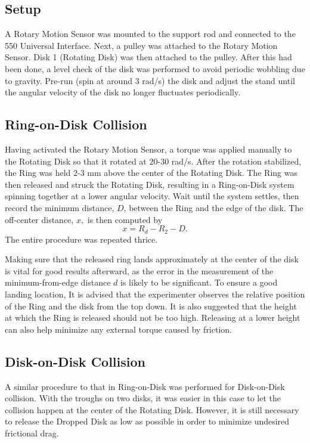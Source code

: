 \subsection{Setup}
A Rotary Motion Sensor was mounted to the support rod and connected to the 550 Universal Interface. Next, a pulley was attached to the Rotary Motion Sensor. Disk 1 (Rotating Disk) was then attached to the pulley. After this had been done, a level check of the disk was performed to avoid periodic wobbling due to gravity. Pre-run (spin at around $3$ rad/s) the disk and adjust the stand until the angular velocity of the disk no longer fluctuates periodically.

\subsection{Ring-on-Disk Collision}
Having activated the Rotary Motion Sensor, a torque was applied manually to the Rotating Disk so that it rotated at $20$-$30$ rad/s. After the rotation stabilized, the Ring was held $2$-$3$ mm above the center of the Rotating Disk. The Ring was then released and struck the Rotating Disk, resulting in a Ring-on-Disk system spinning together at a lower angular velocity. Wait until the system settles, then record the minimum distance, $D$, between the Ring and the edge of the disk. The off-center distance, $x,$ is then computed by
$$
x = R_d-R_2-D.
$$
The entire procedure was repeated thrice.

Making sure that the released ring lands approximately at the center of the disk is vital for good results afterward, as the error in the measurement of the minimum-from-edge distance $d$ is likely to be significant. To ensure a good landing location,
It is advised that the experimenter observes the relative position of the Ring and the disk from the top down. It is also suggested that the height at which the Ring is released should not be too high. Releasing at a lower height can also help minimize any external torque caused by friction.

\subsection{Disk-on-Disk Collision}
A similar procedure to that in Ring-on-Disk was performed for Disk-on-Disk collision. With the troughs on two disks, it was easier in this case to let the collision happen at the center of the Rotating Disk. However, it is still necessary to release the Dropped Disk as low as possible in order to minimize undesired frictional drag.

